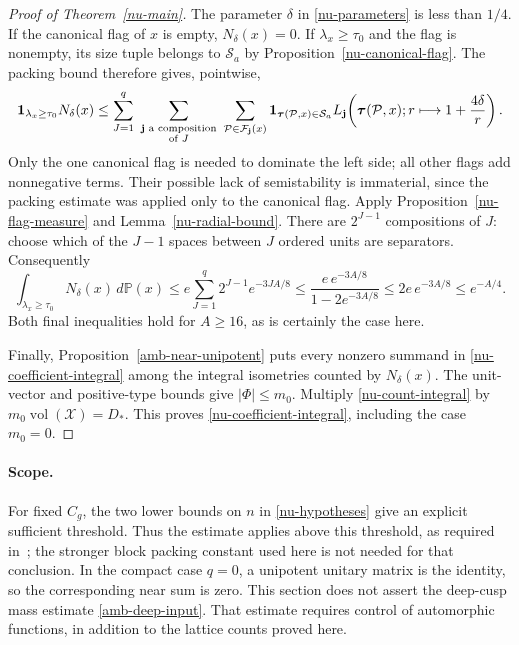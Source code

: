 \begin{proof}[Proof of Theorem~\ref{nu-main}]
The parameter $\delta$ in \eqref{nu-parameters}
is less than $1/4$.  If the canonical flag of
$x$ is empty, $N_\delta(x)=0$.
If $\lambda_x\ge\tau_0$ and the flag is
nonempty, its size tuple belongs to
$\mathcal S_a$ by
Proposition~\ref{nu-canonical-flag}.
The packing bound therefore gives, pointwise,
\[
 \begin{split}
 {\bf1}_{\lambda_x\ge\tau_0}N_\delta(x)
 \le\sum_{J=1}^{q}\ 
       \sum_{\substack{\mathbf j\text{ a composition}\\
                       \text{of }J}}\ 
       \sum_{\mathcal P\in\mathcal F_{\mathbf j}(x)}
       {\bf1}_{\boldsymbol\tau(\mathcal P,x)\in\mathcal S_a}
       L_{\mathbf j}\!\left(\boldsymbol\tau(\mathcal P,x);
                      r\longmapsto1+\frac{4\delta}{r}\right).
 \end{split}
\]
Only the one canonical flag is needed to
dominate the left side; all other flags add
nonnegative terms.  Their possible lack of
semistability is immaterial, since the
packing estimate was applied only to the
canonical flag.
Apply Proposition~\ref{nu-flag-measure}
and Lemma~\ref{nu-radial-bound}.
There are $2^{J-1}$ compositions of $J$:
choose which of the $J-1$ spaces between
$J$ ordered units are separators.
Consequently
\[
 \int_{\lambda_x\ge\tau_0}N_\delta(x)\,d\mathbb P(x)
 \le e\sum_{J=1}^{q}2^{J-1}e^{-3JA/8}
 \le\frac{e\,e^{-3A/8}}{1-2e^{-3A/8}}
 \le2e\,e^{-3A/8}\le e^{-A/4}.
\]
Both final inequalities hold for $A\ge16$,
as is certainly the case here.

Finally, Proposition~\ref{amb-near-unipotent}
puts every nonzero summand in
\eqref{nu-coefficient-integral} among the
integral isometries counted by $N_\delta(x)$.
The unit-vector and positive-type bounds
give $|\Phi|\le m_0$.  Multiply
\eqref{nu-count-integral} by
$m_0\operatorname{vol}(\mathcal X)=D_*$.
This proves \eqref{nu-coefficient-integral},
including the case $m_0=0$.
\end{proof}

\paragraph{Scope.}
For fixed $C_g$, the two lower bounds on $n$
in \eqref{nu-hypotheses} give an explicit
sufficient threshold.  Thus the estimate applies above this threshold,
as required in~\cite{alpo-uniform-source}; the stronger
block packing constant used here is not needed for that conclusion.  In the compact case
$q=0$, a unipotent unitary matrix is the
identity, so the corresponding near sum is
zero.  This section does not assert the
deep-cusp mass estimate
\eqref{amb-deep-input}.  That estimate
requires control of automorphic functions,
in addition to the lattice counts proved here.


